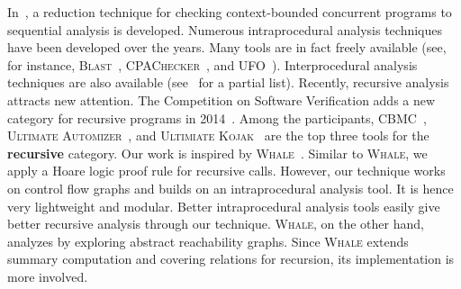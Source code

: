 In~\cite{LalR08,LalR09}, a reduction technique for checking context-bounded concurrent programs to sequential analysis is developed. Numerous intraprocedural analysis techniques have been developed over the years. Many tools are in fact freely available (see, for instance, \textsc{Blast}~\cite{BeyerHJM07}, \textsc{CPAChecker}~\cite{BeyerK11}, and \textsc{UFO}~\cite{AlbarghouthiLGC12}). Interprocedural analysis techniques are also available (see~\cite{RepsHS95,BallR01,CousotCFMMMR05,CuoqKKPSY12,coverity,polyspace} for a partial list). Recently, recursive analysis attracts new attention. The Competition on Software Verification adds a new category for recursive programs in 2014~\cite{svcomp14}. Among the participants, \textsc{CBMC}~\cite{ClarkeKL04}, \textsc{Ultimate Automizer}~\cite{HeizmannCDEHLNSP13}, and \textsc{Ultimiate Kojak}~\cite{Kojak} are the top three tools for the \textbf{recursive} category. Our work is inspired by \textsc{Whale}~\cite{AlbarghouthiGC12}. Similar to \textsc{Whale}, we apply a Hoare logic proof rule for recursive calls. However, our technique works on control flow graphs and builds on an intraprocedural analysis tool. It is hence very lightweight and modular. Better intraprocedural analysis tools easily give better recursive analysis through our technique. \textsc{Whale}, on the other hand, analyzes by exploring abstract reachability graphs. Since \textsc{Whale} extends summary computation and covering relations for recursion, its implementation is more involved.
